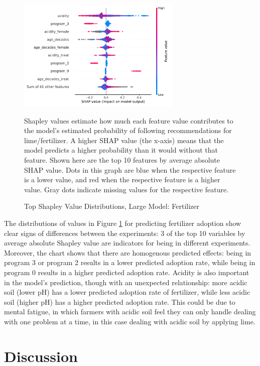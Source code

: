\documentclass[12pt]{article}
\begin{document}
\begin{figure}[H]
    \centering
    \caption{Top Shapley Value Distributions, Large Model: Fertilizer}
    \includegraphics[width=0.7\textwidth]{../output/shap_beeswarm_fert.pdf}
    \begin{minipage}{0.7\textwidth}
    \tiny
    Shapley values estimate how much each feature value contributes to the model's estimated probability of following recommendations for lime/fertilizer. A higher SHAP value (the x-axis) means that the model predicts a higher probability than it would without that feature. Shown here are the top 10 features by average absolute SHAP value. Dots in this graph are blue when the respective feature is a lower value, and red when the respective feature is a higher value. Gray dots indicate missing values for the respective feature.
    \end{minipage}
    \label{fig:shap_fert}
\end{figure}

The distributions of values in Figure \ref{fig:shap_fert} for predicting fertilizer adoption show clear signs of differences between the experiments: 3 of the top 10 variables by average absolute Shapley value are indicators for being in different experiments. Moreover, the chart shows that there are homogenous predicted effects: being in program 3 or program 2 results in a lower predicted adoption rate, while being in program 0 results in a higher predicted adoption rate. Acidity is also important in the model's prediction, though with an unexpected relationship: more acidic soil (lower pH) has a lower predicted adoption rate of fertilizer, while less acidic soil (higher pH) has a higher predicted adoption rate. This could be due to mental fatigue, in which farmers with acidic soil feel they can only handle dealing with one problem at a time, in this case dealing with acidic soil by applying lime.

\section{Discussion}
\label{section:discussion}
\end{document}
